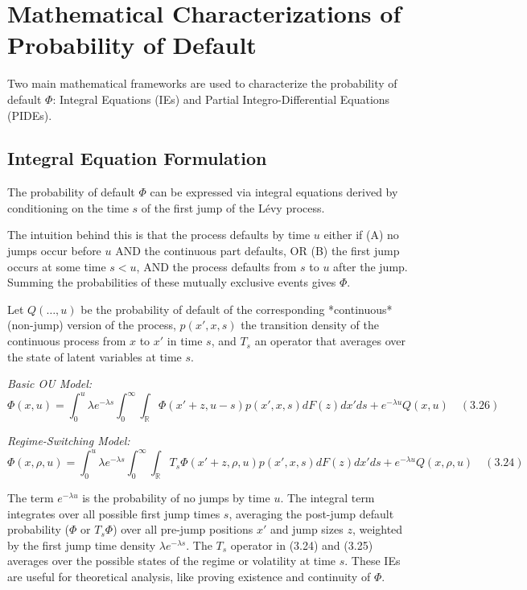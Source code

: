 \documentclass[11pt,twoside,openright]{report}
\begin{document}
\section{Mathematical Characterizations of Probability of Default}

Two main mathematical frameworks are used to characterize the probability of default $\Phi$: Integral Equations (IEs) and Partial Integro-Differential Equations (PIDEs).

\subsection{Integral Equation Formulation}

The probability of default $\Phi$ can be expressed via integral equations derived by conditioning on the time $s$ of the first jump of the Lévy process.

The intuition behind this is that the process defaults by time $u$ either if (A) no jumps occur before $u$ AND the continuous part defaults, OR (B) the first jump occurs at some time $s < u$, AND the process defaults from $s$ to $u$ after the jump. Summing the probabilities of these mutually exclusive events gives $\Phi$.

Let $Q(\dots, u)$ be the probability of default of the corresponding *continuous* (non-jump) version of the process, $p(x', x, s)$ the transition density of the continuous process from $x$ to $x'$ in time $s$, and $T_s$ an operator that averages over the state of latent variables at time $s$.

\textit{Basic OU Model:}
$$ \Phi(x, u) = \int_0^u \lambda e^{-\lambda s} \int_0^\infty \int_{\mathbb{R}} \Phi(x' + z, u-s) p(x', x, s) dF(z) dx' ds + e^{-\lambda u} Q(x, u) \quad (3.26) $$


\textit{Regime-Switching Model:}
$$ \Phi(x, \rho, u) = \int_0^u \lambda e^{-\lambda s} \int_0^\infty \int_{\mathbb{R}} T_s\Phi(x' + z, \rho, u) p(x', x, s) dF(z) dx' ds + e^{-\lambda u} Q(x, \rho, u) \quad (3.24) $$




The term $e^{-\lambda u}$ is the probability of no jumps by time $u$. The integral term integrates over all possible first jump times $s$, averaging the post-jump default probability ($\Phi$ or $T_s\Phi$) over all pre-jump positions $x'$ and jump sizes $z$, weighted by the first jump time density $\lambda e^{-\lambda s}$. The $T_s$ operator in (3.24) and (3.25) averages over the possible states of the regime or volatility at time $s$. These IEs are useful for theoretical analysis, like proving existence and continuity of $\Phi$.
\end{document}
